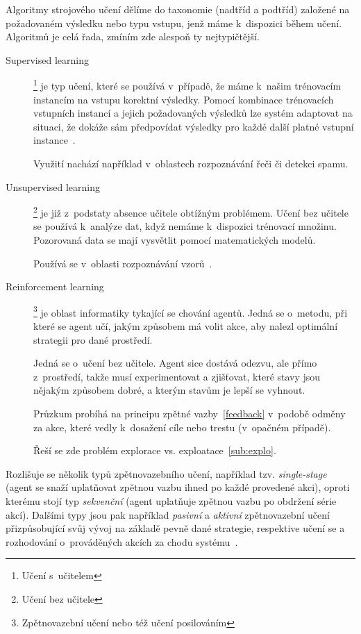 \documentclass[thesis=M,czech]{FITthesis}[2014/05/07]
\begin{document}
Algoritmy strojového učení dělíme do taxonomie (nadtříd a podtříd) založené na požadovaném výsledku nebo typu vstupu, jenž máme k~dispozici během učení. Algoritmů je celá řada, zmíním zde alespoň ty nejtypičtější. 

\begin{description}
  \item[Supervised learning]\footnote{Učení s~učitelem} je typ učení, které se používá v~případě, že máme k~našim trénovacím instancím na vstupu korektní výsledky. Pomocí kombinace trénovacích vstupních instancí a jejich požadovaných výsledků lze systém adaptovat na situaci, že dokáže sám předpovídat výsledky pro každé další platné vstupní instance~\cite{aihorizon}.
  
  Využití nachází například v~oblastech rozpoznávání řeči či detekci spamu.
  \item[Unsupervised learning]\footnote{Učení bez učitele} je již z~podstaty absence učitele obtížným problémem. Učení bez učitele se používá k~analýze dat, když nemáme k~dispozici trénovací množinu. Pozorovaná data se mají vysvětlit pomocí matematických modelů.
  
  Používá se v~oblasti rozpoznávání vzorů~\cite{hlavac}.
  \item[Reinforcement learning]\footnote{Zpětnovazební učení nebo též učení posilováním} je oblast informatiky tykající se chování agentů. Jedná se o~metodu, při které se agent učí, jakým způsobem má volit akce, aby nalezl optimální strategii pro dané prostředí.
  
  Jedná se o~učení bez učitele. Agent sice dostává odezvu, ale přímo z~prostředí, takže musí experimentovat a zjišťovat, které stavy jsou nějakým způsobem dobré, a kterým stavům je lepší se vyhnout.
  
  Průzkum probíhá na principu zpětné vazby~\ref{feedback} v~podobě odměny za akce, které vedly k~dosažení cíle nebo trestu (v~opačném případě).
  
  Řeší se zde problém explorace vs. exploatace~\ref{sub:explo}. 
\end{description}

Rozlišuje se několik typů zpětnovazebního učení, například tzv. \emph{single-stage} (agent se snaží uplatňovat zpětnou vazbu ihned po každé provedené akci), oproti kterému stojí typ \emph{sekvenční} (agent uplatňuje zpětnou vazbu po obdržení série akcí). Dalšími typy jsou pak například \emph{pasivní} a \emph{aktivní} zpětnovazební učení přizpůsobující svůj vývoj na základě pevně dané strategie, respektive učení se a rozhodování o~prováděných akcích za chodu systému~\cite{reinforcement}.
\end{document}
